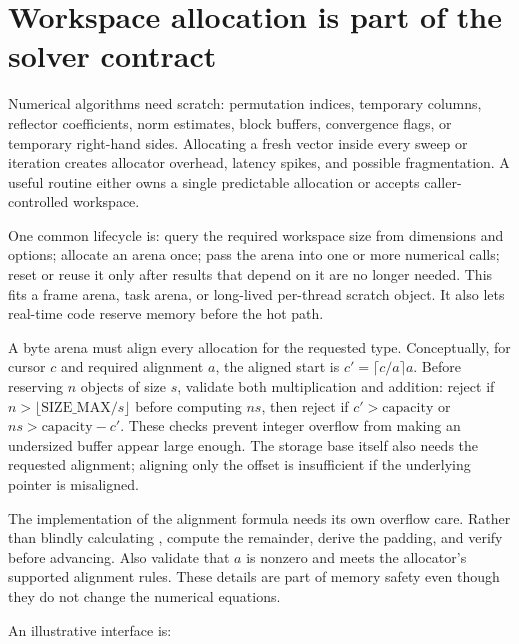 \section{Workspace allocation is part of the solver contract}\label{02-foundations-ii-ch038-workspace-allocation-is-part-of-the-solver-contract}

\hypertarget{02-foundations-ii-ch038-workspace-allocation-is-part-of-the-solver-contract}{}

Numerical algorithms need scratch: permutation indices, temporary columns, reflector coefficients, norm estimates, block buffers, convergence flags, or temporary right-hand sides. Allocating a fresh vector inside every sweep or iteration creates allocator overhead, latency spikes, and possible fragmentation. A useful routine either owns a single predictable allocation or accepts caller-controlled workspace.

One common lifecycle is: query the required workspace size from dimensions and options; allocate an arena once; pass the arena into one or more numerical calls; reset or reuse it only after results that depend on it are no longer needed. This fits a frame arena, task arena, or long-lived per-thread scratch object. It also lets real-time code reserve memory before the hot path.

A byte arena must align every allocation for the requested type. Conceptually, for cursor \(c\) and required alignment \(a\), the aligned start is \(c'=\lceil c/a\rceil a\). Before reserving \(n\) objects of size \(s\), validate both multiplication and addition: reject if \(n>\lfloor\text{SIZE\_MAX}/s\rfloor\) before computing \(ns\), then reject if \(c'>\text{capacity}\) or \(ns>\text{capacity}-c'\). These checks prevent integer overflow from making an undersized buffer appear large enough. The storage base itself also needs the requested alignment; aligning only the offset is insufficient if the underlying pointer is misaligned.

The implementation of the alignment formula needs its own overflow care. Rather than blindly calculating , compute the remainder, derive the padding, and verify  before advancing. Also validate that \(a\) is nonzero and meets the allocator's supported alignment rules. These details are part of memory safety even though they do not change the numerical equations.

An illustrative interface is:

